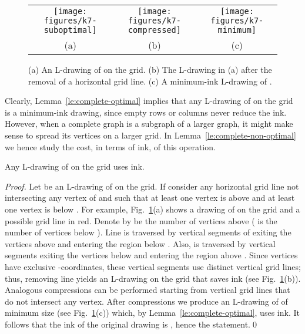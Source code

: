 \documentclass{llncs}
\begin{document}
\begin{figure}[htb]
\begin{center}
\begin{tabular}{c @{\hspace{1em}} c @{\hspace{1em}} c  }
   \texttt{[image: figures/k7-suboptimal]} &
   \texttt{[image: figures/k7-compressed]} &
   \texttt{[image: figures/k7-minimum]} \\
   (a) & (b) & (c)\\
\end{tabular}
    \caption{(a) An L-drawing of  on the  grid. (b) The L-drawing in (a) after the removal of a horizontal grid line. (c) A minimum-ink L-drawing of .}\label{fi:k7}
    \end{center}
\end{figure}

Clearly, Lemma~\ref{le:complete-optimal} implies that any L-drawing of  on the  grid is a minimum-ink drawing, since empty rows or columns never reduce the ink. However, when a complete graph  is a subgraph of a larger graph, it might make sense to spread its vertices on a larger grid. In Lemma~\ref{le:complete-non-optimal} we hence study the cost, in terms of ink, of this operation.

\begin{lemma}\label{le:complete-non-optimal}
Any L-drawing of  on the  grid uses  ink.
\end{lemma}
\begin{proof}
Let  be an L-drawing of  on the  grid. If  consider any horizontal grid line  not intersecting any vertex of  and such that at least one vertex is above  and at least one vertex is below . For example, Fig.~\ref{fi:k7}(a) shows a drawing of  on the  grid and a possible grid line  in red. Denote by  be the number of vertices above  ( is the number of vertices below ). Line  is traversed by  vertical segments of  exiting the  vertices above  and entering the region below . Also,  is traversed by  vertical segments exiting the  vertices below  and entering the region above . Since vertices have exclusive -coordinates, these  vertical segments use distinct vertical grid lines; thus, removing line  yields an L-drawing  on the  grid that saves  ink (see Fig.~\ref{fi:k7}(b)).
Analogous compressions can be performed starting from vertical grid lines that do not intersect any vertex.
After  compressions we produce an L-drawing of  of minimum size (see Fig.~\ref{fi:k7}(c)) which, by Lemma~\ref{le:complete-optimal}, uses  ink. It follows that the ink of the original drawing is  , hence the statement.\qed
\end{proof}
\end{document}
